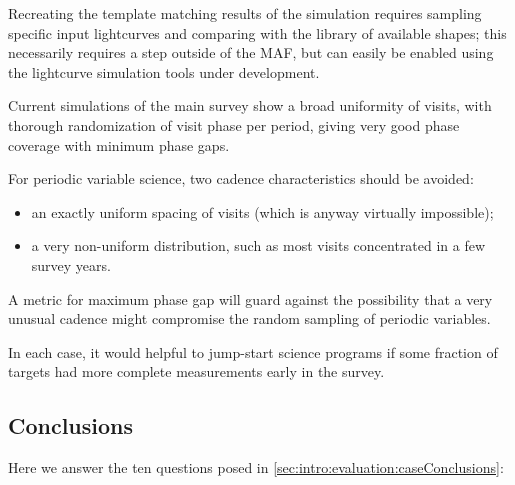 Recreating the template matching results of the
\citet{2012AJ....144....9O} simulation requires sampling specific input
lightcurves and comparing with the library of available shapes; this
necessarily requires a step outside of the MAF, but can easily be
enabled using the lightcurve simulation tools under development.

Current simulations of the main survey show a broad uniformity of
visits, with thorough randomization of visit phase per period, giving
very good phase coverage with minimum phase gaps.


%

For periodic variable science, two cadence characteristics should be avoided:
\begin{itemize}
\item an exactly uniform spacing of visits (which is anyway virtually impossible); \
\item a very non-uniform distribution, such as most visits concentrated in a few survey years.
 \end{itemize}

A metric for maximum phase gap will guard against the possibility that a
very unusual cadence might compromise the random sampling of periodic
variables.

In each case, it would helpful to jump-start science programs if some
fraction of targets had more complete measurements early in the survey.


 \subsection{Conclusions}

 Here we answer the ten questions posed in
 \autoref{sec:intro:evaluation:caseConclusions}:

